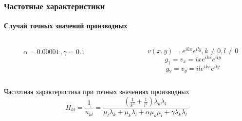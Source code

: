 \documentclass[11pt]{beamer}
\begin{document}
\begin{frame}
\frametitle{Частотные характеристики}
\framesubtitle{Случай точных значений производных}
\begin{columns}
\begin{column}{0.5\linewidth}
\begin{figure}[H]
\caption{$\alpha = 0.00001\,,\gamma = 0.1$}
\end{figure}
\end{column}
\begin{column}{0.5\textwidth}
$$v(x,y) = e^{ikx}e^{ily}, k \neq 0, l \neq 0$$
$$g_1 = v_x =ixe^{ikx}e^{ily}$$
$$ g_2 = v_y = ile^{ikx}e^{ily}$$
\end{column}

\end{columns}
\begin{block}{Частотная характеристика при точных значениях производных}
$$
H_{kl} = \frac{1}{u_{kl}} = \frac{(\frac{1}{k^2} + \frac{1}{l^2})\lambda_k\lambda_l}{\mu_l \lambda_k + \mu_k \lambda_l + \alpha \mu_k \mu_l + \gamma \lambda_k \lambda_l}
$$
\end{block}
\end{frame}
\end{document}
